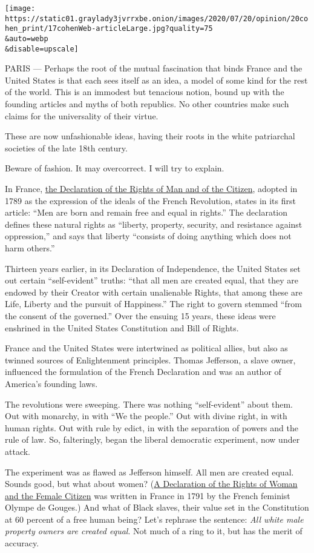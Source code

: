 \texttt{[image: https://static01.graylady3jvrrxbe.onion/images/2020/07/20/opinion/20cohen\_print/17cohenWeb-articleLarge.jpg?quality=75\\\&auto=webp\\\&disable=upscale]}

PARIS --- Perhaps the root of the mutual fascination that binds France
and the United States is that each sees itself as an idea, a model of
some kind for the rest of the world. This is an immodest but tenacious
notion, bound up with the founding articles and myths of both republics.
No other countries make such claims for the universality of their
virtue.

These are now unfashionable ideas, having their roots in the white
patriarchal societies of the late 18th century.

Beware of fashion. It may overcorrect. I will try to explain.

In France,
\href{https://avalon.law.yale.edu/18th_century/rightsof.asp}{the
Declaration of the Rights of Man and of the Citizen}, adopted in 1789 as
the expression of the ideals of the French Revolution, states in its
first article: ``Men are born and remain free and equal in rights.'' The
declaration defines these natural rights as ``liberty, property,
security, and resistance against oppression,'' and says that liberty
``consists of doing anything which does not harm others.''

Thirteen years earlier, in its Declaration of Independence, the United
States set out certain ``self-evident'' truths: ``that all men are
created equal, that they are endowed by their Creator with certain
unalienable Rights, that among these are Life, Liberty and the pursuit
of Happiness.'' The right to govern stemmed ``from the consent of the
governed.'' Over the ensuing 15 years, these ideas were enshrined in the
United States Constitution and Bill of Rights.

France and the United States were intertwined as political allies, but
also as twinned sources of Enlightenment principles. Thomas Jefferson, a
slave owner, influenced the formulation of the French Declaration and
was an author of America's founding laws.

The revolutions were sweeping. There was nothing ``self-evident'' about
them. Out with monarchy, in with ``We the people.'' Out with divine
right, in with human rights. Out with rule by edict, in with the
separation of powers and the rule of law. So, falteringly, began the
liberal democratic experiment, now under attack.

The experiment was as flawed as Jefferson himself. All men are created
equal. Sounds good, but what about women?
(\href{https://www.bl.uk/collection-items/the-declaration-of-the-rights-of-woman-and-the-citizen}{A
Declaration of the Rights of Woman and the Female Citizen} was written
in France in 1791 by the French feminist Olympe de Gouges.) And what of
Black slaves, their value set in the Constitution at 60 percent of a
free human being? Let's rephrase the sentence: \emph{All white male
property owners are created equal}. Not much of a ring to it, but has
the merit of accuracy.

